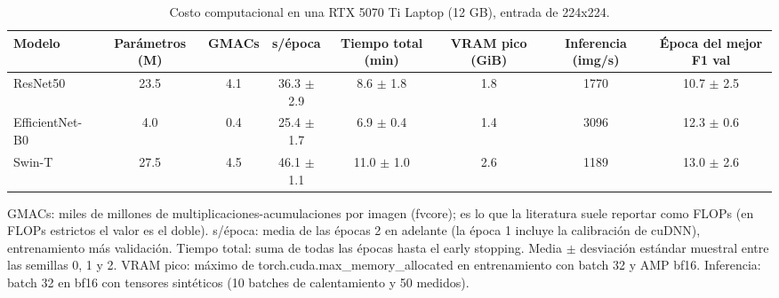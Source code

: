 \begin{table}[t]
\centering
\caption{Costo computacional en una RTX 5070 Ti Laptop (12 GB), entrada de 224x224.}
\label{tab:tabla2_costo}
\footnotesize
\begin{tabular}{lccccccc}
\toprule
Modelo & Parámetros (M) & GMACs & s/época & Tiempo total (min) & VRAM pico (GiB) & Inferencia (img/s) & Época del mejor F1 val \\
\midrule
ResNet50 & 23.5 & 4.1 & 36.3 $\pm$ 2.9 & 8.6 $\pm$ 1.8 & 1.8 & 1770 & 10.7 $\pm$ 2.5 \\
EfficientNet-B0 & 4.0 & 0.4 & 25.4 $\pm$ 1.7 & 6.9 $\pm$ 0.4 & 1.4 & 3096 & 12.3 $\pm$ 0.6 \\
Swin-T & 27.5 & 4.5 & 46.1 $\pm$ 1.1 & 11.0 $\pm$ 1.0 & 2.6 & 1189 & 13.0 $\pm$ 2.6 \\
\bottomrule
\end{tabular}
\par\vspace{2pt}
\parbox{\linewidth}{\scriptsize GMACs: miles de millones de multiplicaciones-acumulaciones por imagen (fvcore); es lo que la literatura suele reportar como FLOPs (en FLOPs estrictos el valor es el doble). s/época: media de las épocas 2 en adelante (la época 1 incluye la calibración de cuDNN), entrenamiento más validación. Tiempo total: suma de todas las épocas hasta el early stopping. Media $\pm$ desviación estándar muestral entre las semillas 0, 1 y 2. VRAM pico: máximo de torch.cuda.max\_memory\_allocated en entrenamiento con batch 32 y AMP bf16. Inferencia: batch 32 en bf16 con tensores sintéticos (10 batches de calentamiento y 50 medidos).}
\end{table}

